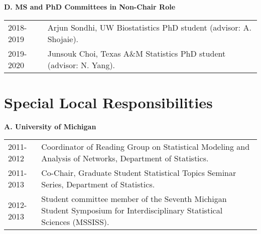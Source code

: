 \documentclass[10pt]{article}
\begin{document}
\textbf{D. MS and PhD Committees in Non-Chair Role}
\begin{table}[H]
\hskip0.9cm\begin{tabular}{p{1.6cm}p{12cm}}
2018-2019 & Arjun Sondhi, UW Biostatistics PhD student (advisor: A. Shojaie). \\
2019-2020 & Junsouk Choi, Texas A\&M Statistics PhD student (advisor: N. Yang). 
\end{tabular}
\end{table}


%
%
%

\section{Special Local Responsibilities}

\textbf{A. University of Michigan}

\begin{table}[H]
\hskip0.9cm\begin{tabular}{p{1.6cm}p{12cm}}
2011-2012 & Coordinator of Reading Group on Statistical Modeling and Analysis of Networks, Department of Statistics.\\
2011-2013 & Co-Chair, Graduate Student Statistical Topics Seminar Series, Department of Statistics.\\
2012-2013 & Student committee member of the Seventh Michigan Student Symposium for Interdisciplinary Statistical Sciences (MSSISS).
\end{tabular}
\end{table}
\end{document}

